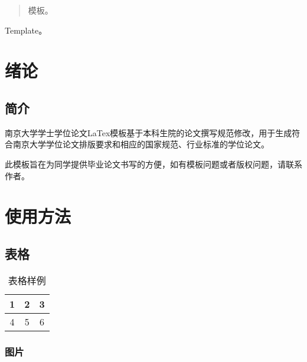 \documentclass[
    Title = 曲率引擎的研究, %
    Title_EN = Curvature engine research,
    Grade = 17,
    StudentID = 17184xxx,
    StudentName = 张三,
    StudentName_EN = ZhangSan,
    Department = 未来学院,
    Department_EN = School of future,
    Major = 未来学,
    Major_EN = Future,
    Mentor = 李四,
    Mentor_EN = LiSi,
    MentorTitle = 教授,
    MentorTitle_EN = Professor,
    SubmitDate = 2077年12月31日,
    Degree = 本科, %
    Type = thesis %
]{njuthesis}
\begin{document}
\maketitle


\begin{abstract}
    模板。
\end{abstract}

\begin{englishabstract}
    Template。
  \end{englishabstract}

\tableofcontents
\mainmatter

\chapter{绪论}
    \section{简介}
    南京大学学士学位论文LaTex模板\cite{test1}基于本科生院的论文撰写规范修改，用于生成符合南京大学学位论文排版要求和相应的国家规范、行业标准的学位论文。

    此模板旨在为同学提供毕业论文书写的方便，如有模板问题或者版权问题，请联系作者。
\chapter{使用方法}
    \section{表格}
    \begin{table}[htbp]
        \centering
        \caption{表格样例}
        \begin{tabular}{|c|c|c|}
            \hline
            1 & 2 & 3 \\
            \hline
            4 &  5 & 6 \\
            \hline
        \end{tabular}
    \end{table}
    \subsection{图片}

\printbibliography
\end{document}
